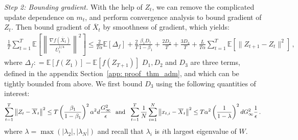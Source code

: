 \documentclass[11pt]{article}
\begin{document}
 \textsl{Step 2: Bounding gradient.} \hspace{0.01in} With the help of $Z_t$, we can remove the complicated update dependence on $m_t$, and perform convergence analysis to bound gradient of $Z_t$. Then bound gradient of $\overline X_t$ by smoothness of gradient, which yields:
 {\small
 \begin{align} \label{eq: exp_telescope_sketchmain}
 \frac{1}{T}\sum_{t=1}^T  \mathbb E \left [\left\|\frac{\nabla f( \overline X_{t})}{\overline U_{t}^{1/4}}\right\|^2  \right] \leq \frac{2}{T\alpha}  \mathbb E  [\Delta_f] 
 + \frac{2}{T}\frac{\beta_1 D_1}{1-\beta_1} 
  + \frac{2 D_2}{T}  + \frac{3 D_3}{T} + \frac{L}{T\alpha} \sum_{t=1}^T\mathbb E\left[\| Z_{t+1}-  Z_{t}\|^2 \right]\, ,
 \end{align}
 }%
where $\Delta_f : = \mathbb E [f( Z_{1})] - \mathbb E [f( Z_{T+1})]$ $D_1, D_2$ and $D_3$ are three terms, defined in the appendix Section~\ref{app: proof_thm_adm}, and which can be tightly bounded from above. 
We first bound $D_3$ using the following quantities of interest:
 {\small
 \begin{align}\notag
\sum_{t=1}^T\left\|  Z_{t} -  \overline X_{t}\right\|^2 \leq T \left( \frac{\beta_1}{1-\beta_1}\right)^2 \alpha^2 d \frac{G_{\infty}^2}{\epsilon} \text{\ \ and\ \ } 
\sum_{t=1}^T\frac{1}{N}\sum_{i=1}^N\left\| {  x_{t,i} -   \overline X_{t}}  \right\|^2 \leq T \alpha^2 \left (\frac{1}{1-\lambda} \right)^2 d G_{\infty}^2 \frac{1}{\epsilon} \,.
 \end{align}
 }
 where $\lambda = \max (|\lambda_2|,|\lambda_N|)$ and recall that $\lambda_i$ is $i$th largest eigenvalue of $W$.
 
 
 
\end{document}
